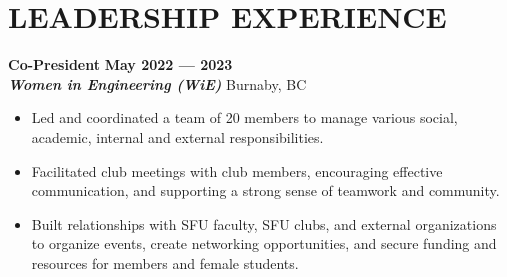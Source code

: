 \documentclass[letterpaper,11pt]{article}
\newcommand{\Item} [1] {
    \item\small{{#1 \vspace{-2pt}}}
}
\newcommand{\employer} [5] {
    {\textbf{#3} \hfill \textbf{#4 --- #5}\\ \textbf{\emph{#1}} \hfill #2\\}
}
\newcommand{\workItemListStart} [0] {
    \vspace{-1pt}
    \begin{itemize}[topsep=0pt,itemsep=-2pt]
}
\newcommand{\workItemListEnd} [0] {
    \end{itemize}
    \vspace{1pt}
}
\begin{document}
    \section{LEADERSHIP EXPERIENCE}
    \employer{Women in Engineering (WiE)}{Burnaby, BC}{Co-President}{May 2022}{2023}
    \workItemListStart{}
        \Item{Led and coordinated a team of 20 members to manage various social, academic, internal and external responsibilities.}
        \Item{Facilitated club meetings with club members, encouraging effective communication, and supporting a strong sense of teamwork and community.}
        \Item{Built relationships with SFU faculty, SFU clubs, and external organizations to organize events, create networking opportunities, and secure funding and resources for members and female students.}
    \workItemListEnd{}

\end{document}
